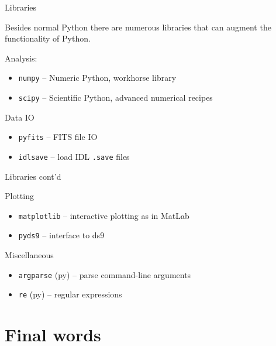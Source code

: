 \documentclass[xetex,10pt]{beamer}
\def\spacer{\vspace*{1em}}
\begin{document}
\begin{frame}[fragile]{Libraries}

Besides normal Python there are numerous libraries that can augment the functionality of Python.

	\spacer

Analysis:
\begin{itemize}
\item \texttt{numpy} -- Numeric Python, workhorse library
\item \texttt{scipy} -- Scientific Python, advanced numerical recipes
\end{itemize}

	\spacer
	\pause

Data IO
\begin{itemize}
\item \texttt{pyfits} -- FITS file IO
\item \texttt{idlsave} -- load IDL \texttt{.save} files
\end{itemize}

	\spacer
\end{frame}

\begin{frame}[fragile]{Libraries cont'd}

Plotting
\begin{itemize}
\item \texttt{matplotlib} -- interactive plotting as in MatLab
\item \texttt{pyds9} -- interface to ds9
\end{itemize}

	\spacer
	\pause

Miscellaneous
\begin{itemize}
\item \texttt{argparse} (py) -- parse command-line arguments
\item \texttt{re} (py) -- regular expressions
\end{itemize}

\end{frame}

\section{Final words}
\end{document}
